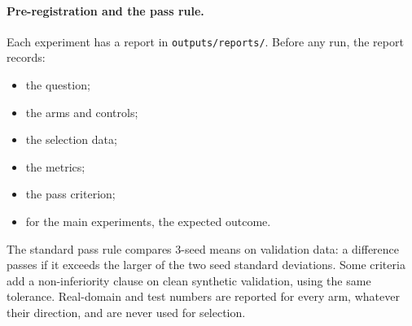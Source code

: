 \paragraph{Pre-registration and the pass rule.}
Each experiment has a report in \texttt{outputs/reports/}. Before any run, the report records:
\begin{itemize}
  \item the question;
  \item the arms and controls;
  \item the selection data;
  \item the metrics;
  \item the pass criterion;
  \item for the main experiments, the expected outcome.
\end{itemize}
The standard pass rule compares 3-seed means on validation data: a difference passes if it exceeds the larger of the two seed standard deviations. Some criteria add a non-inferiority clause on clean synthetic validation, using the same tolerance.
Real-domain and test numbers are reported for every arm, whatever their direction, and are never used for selection.

